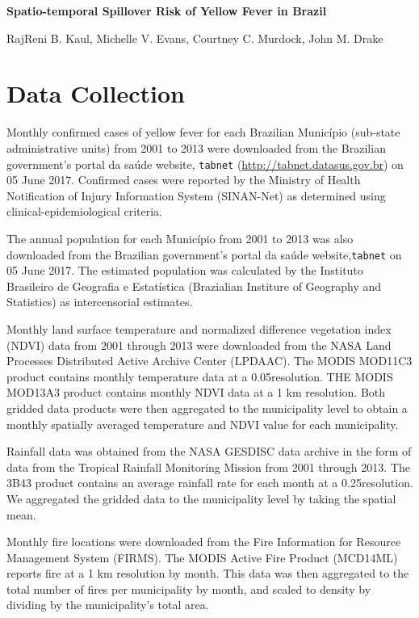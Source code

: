 \documentclass{article}
\begin{document}
\noindent
\textbf{\LARGE{Spatio-temporal Spillover Risk of Yellow Fever in Brazil}}

\bigskip
\noindent
RajReni B. Kaul, Michelle V. Evans, Courtney C. Murdock, John M. Drake
\smallskip

\setcounter{tocdepth}{2}
\tableofcontents

\newpage
\section*{Data Collection}

Monthly confirmed cases of yellow fever for each Brazilian Munic\'{i}pio (sub-state administrative units) from 2001 to 2013 were downloaded from the Brazilian government's portal da sa\'{u}de website, \texttt{tabnet} (\url{http://tabnet.datasus.gov.br}) on 05 June 2017.
Confirmed cases were reported by the Ministry of Health Notification of Injury Information System (SINAN-Net) as determined using clinical-epidemiological criteria.

The annual population for each Munic\'{i}pio from 2001 to 2013 was also downloaded from the Brazilian government's portal da sa\'{u}de website,\texttt{tabnet} on 05 June 2017. The estimated population was calculated by the Instituto Brasileiro de Geografia e Estat\'{i}stica (Brazialian Institure of Geography and Statistics) as intercensorial estimates.

Monthly land surface temperature and normalized difference vegetation index (NDVI) data from 2001 through 2013 were downloaded from the NASA Land Processes Distributed Active Archive Center (LPDAAC). The MODIS MOD11C3 product contains monthly temperature data at a 0.05\degree resolution. THE MODIS MOD13A3 product contains monthly NDVI data at a 1 km resolution. Both gridded data products were then aggregated to the municipality level to obtain a monthly spatially averaged temperature and NDVI value for each municipality.

Rainfall data was obtained from the NASA GESDISC data archive in the form of data from the Tropical Rainfall Monitoring Mission from 2001 through 2013. The 3B43 product contains an average rainfall rate for each month at a 0.25\degree resolution. We aggregated the gridded data to the municipality level by taking the spatial mean.

Monthly fire locations were downloaded from the Fire Information for Resource Management System (FIRMS). The MODIS Active Fire Product (MCD14ML) reports fire at a 1 km resolution by month. This data was then aggregated to the total number of fires per municipality by month, and scaled to density by dividing by the municipality's total area.
\end{document}
